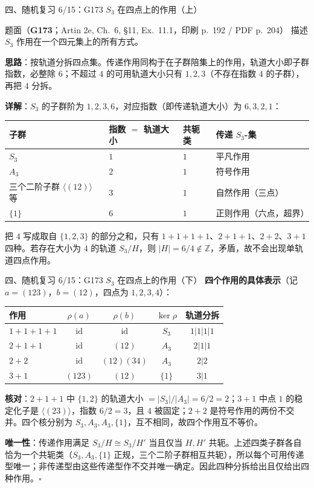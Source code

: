 \documentclass[aspectratio=169,10pt,fontset=none]{ctexbeamer}
\newcommand{\ex}[1]{\textcolor{accent}{\footnotesize\bfseries #1}}
\newcommand{\key}[1]{\textcolor{ink}{\bfseries #1}}
\begin{document}
\begin{frame}[t]{四、随机复习 6/15：G173 $S_3$ 在四点上的作用（上）}
\label{ex:G173}
\scriptsize
\begin{block}{\footnotesize 题面（\ex{G173}；Artin 2e, Ch.~6, §11, Ex.~11.1，印刷 p.~192 / PDF p.~204）}
描述 $S_3$ 作用在一个四元集上的所有方式。
\end{block}
\key{思路}：按轨道分拆四点集。传递作用同构于在子群陪集上的作用，轨道大小即子群指数，必整除 $6$；不超过 $4$ 的可用轨道大小只有 $1,2,3$（不存在指数 $4$ 的子群），再把 $4$ 分拆。

\key{详解}：$S_3$ 的子群阶为 $1,2,3,6$，对应指数（即传递轨道大小）为 $6,3,2,1$：
\begin{center}
{\scriptsize
\begin{tabular}{@{}llll@{}}
\toprule
子群 & 指数 $=$ 轨道大小 & 共轭类 & 传递 $S_3$-集\\ \midrule
$S_3$ & $1$ & $1$ & 平凡作用\\
$A_3$ & $2$ & $1$ & 符号作用\\
三个二阶子群 $\langle(12)\rangle$ 等 & $3$ & $1$ & 自然作用（三点）\\
$\{1\}$ & $6$ & $1$ & 正则作用（六点，超界）\\ \bottomrule
\end{tabular}}
\end{center}
把 $4$ 写成取自 $\{1,2,3\}$ 的部分之和，只有 $1+1+1+1$、$2+1+1$、$2+2$、$3+1$ 四种。若存在大小为 $4$ 的轨道 $S_3/H$，则 $|H|=6/4\notin\mathbb Z$，矛盾，故不会出现单轨道四点作用。
\end{frame}

\begin{frame}[t]{四、随机复习 6/15：G173 $S_3$ 在四点上的作用（下）}
\scriptsize
\key{四个作用的具体表示}（记 $a=(123)$，$b=(12)$，四点为 $1,2,3,4$）：
\begin{center}
{\scriptsize
\begin{tabular}{@{}lcccc@{}}
\toprule
作用 & $\rho(a)$ & $\rho(b)$ & $\ker\rho$ & 轨道分拆\\ \midrule
$1+1+1+1$ & $\mathrm{id}$ & $\mathrm{id}$ & $S_3$ & $1|1|1|1$\\
$2+1+1$ & $\mathrm{id}$ & $(12)$ & $A_3$ & $2|1|1$\\
$2+2$ & $\mathrm{id}$ & $(12)(34)$ & $A_3$ & $2|2$\\
$3+1$ & $(123)$ & $(12)$ & $\{1\}$ & $3|1$\\ \bottomrule
\end{tabular}}
\end{center}
\key{核对}：$2+1+1$ 中 $\{1,2\}$ 的轨道大小 $=|S_3|/|A_3|=6/2=2$；$3+1$ 中点 $1$ 的稳定化子是 $\langle(23)\rangle$，指数 $6/2=3$，且 $4$ 被固定；$2+2$ 是符号作用的两份不交并。四个核分别为 $S_3,A_3,A_3,\{1\}$，互不相同，故四个作用互不等价。

\key{唯一性}：传递作用满足 $S_3/H\cong S_3/H'$ 当且仅当 $H,H'$ 共轭。上述四类子群各自恰为一个共轭类（$S_3,A_3,\{1\}$ 正规，三个二阶子群相互共轭），所以每个可用传递型唯一；非传递型由这些传递型作不交并唯一确定。因此四种分拆给出且仅给出四种作用。$\square$
\end{frame}
\end{document}
